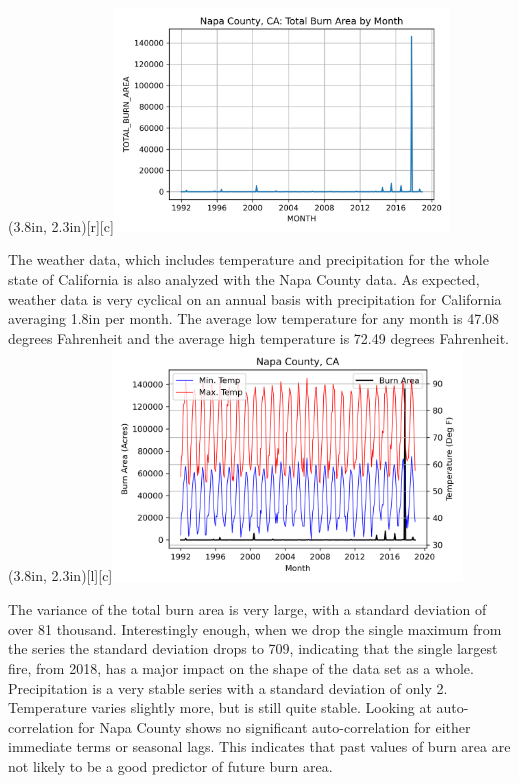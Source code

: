 \documentclass[12pt]{article}
\begin{document}
\parpic(3.8in, 2.3in)[r][c]{\includegraphics[width=3.5in]{./img/NapaTimeSeriesPlot.png}}

The weather data, which includes temperature and precipitation for the whole state of California is also analyzed with the Napa County data. As expected, weather data is very cyclical on an annual basis with precipitation for California averaging 1.8in per month. The average low temperature for any month is 47.08 degrees Fahrenheit and the average high temperature is 72.49 degrees Fahrenheit. \\[0.3in]

\parpic(3.8in, 2.3in)[l][c]{\includegraphics[width=3.65in]{./img/NapaTempPlot.png}}

The variance of the total burn area is very large, with a standard deviation of over 81 thousand. Interestingly enough, when we drop the single maximum from the series the standard deviation drops to 709, indicating that the single largest fire, from 2018, has a major impact on the shape of the data set as a whole. Precipitation is a very stable series with a standard deviation of only 2. Temperature varies slightly more, but is still quite stable. Looking at auto-correlation for Napa County shows no significant auto-correlation for either immediate terms or seasonal lags. This indicates that past values of burn area are not likely to be a good predictor of future burn area. \\
\end{document}
